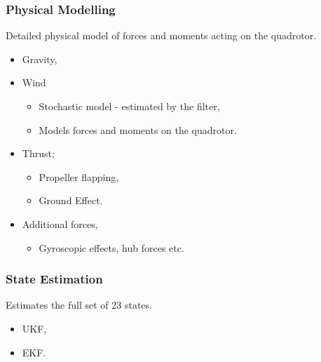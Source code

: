 \documentclass{beamer}
\begin{document}
\begin{frame}
    \frametitle{Physical Modelling}
    Detailed physical model of forces and moments acting on the quadrotor.
    \begin{itemize}
        \item Gravity,
        \item Wind
        \begin{itemize}
            \item Stochastic model - estimated by the filter,
            \item Models forces and moments on the quadrotor.
        \end{itemize}
        \item Thrust;
        \begin{itemize}
            \item Propeller flapping,
            \item Ground Effect.
        \end{itemize}
        \item Additional forces,
        \begin{itemize}
            \item Gyroscopic effects, hub forces etc.
        \end{itemize}
    \end{itemize}
\end{frame}


\begin{frame}
    \frametitle{State Estimation}
    Estimates the full set of 23 states.
    \begin{itemize}
        \item UKF,
        \item EKF.
    \end{itemize}
\end{frame}
\end{document}
